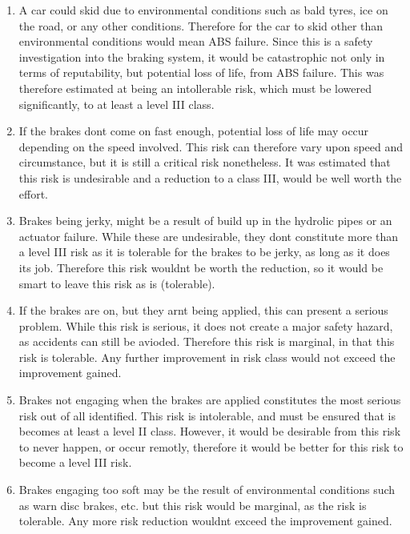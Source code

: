 \documentclass{article}
\begin{document}
\begin{enumerate}
\item A car could skid due to environmental conditions such as bald tyres,
	ice on the road, or any other conditions.  Therefore for the car to skid
	other than environmental conditions would mean ABS failure.  Since this
	is a safety investigation into the braking system, it would be catastrophic
	not only in terms of reputability, but potential loss of life, from ABS
	failure.  This was therefore estimated at being an intollerable risk, 
	which must be lowered significantly, to at least a level III class.

\item If the brakes dont come on fast enough, potential loss of life may occur
	depending on the speed involved.  This risk can therefore vary upon speed
	and circumstance, but it is still a critical risk nonetheless.  It was 
	estimated that this risk is undesirable and a reduction to a class III,
	would be well worth the effort.

\item Brakes being jerky, might be a result of build up in the hydrolic pipes
	or an actuator failure.  While these are undesirable, they dont constitute
	more than a level III risk as it is tolerable for the brakes to be jerky,
	as long as it does its job.  Therefore this risk wouldnt be worth  the 
	reduction, so it would be smart to leave this risk as is (tolerable).

\item If the brakes are on, but they arnt being applied, this can present a 
	serious problem.  While this risk is serious, it does not create a major
	safety hazard, as accidents can still be avioded.  Therefore this risk is
	marginal, in that this risk is tolerable.  Any further improvement in
	risk class would not exceed the improvement gained.

\item Brakes not engaging when the brakes are applied constitutes the most 
	serious risk out of all identified.  This risk is intolerable, and must
	be ensured that is becomes at least a level II class.  However,
	it would be desirable from this risk to never happen, or occur remotly,
	therefore it would be better for this risk to become a level III risk.

\item Brakes engaging too soft may be the result of environmental conditions
	such as warn disc brakes, etc. but this risk would be marginal, as the
	risk is tolerable.  Any more risk reduction wouldnt exceed the improvement
	gained.


\end{enumerate}
\end{document}
